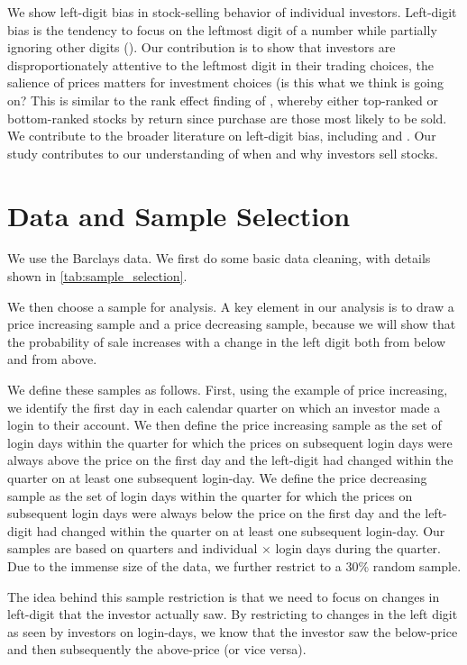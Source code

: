 We show left-digit bias in stock-selling behavior of individual investors. Left-digit bias is the tendency to focus on the leftmost digit of a number while partially ignoring other digits (\citealp{poltrock1984comparative}). Our contribution is to show that investors are disproportionately attentive to the leftmost digit in their trading choices, the salience of prices matters for investment choices (is this what we think is going on?  This is similar to the rank effect finding of \cite{hartzmark2015}, whereby either top-ranked or bottom-ranked stocks by return since purchase are those most likely to be sold. We contribute to the broader literature on left-digit bias, including \cite{lacetera2012heuristic} and \cite{shlain2018more}. Our study contributes to our understanding of when and why investors sell stocks. 

\section{Data and Sample Selection}

We use the Barclays data. We first do some basic data cleaning, with details shown in \ref{tab:sample_selection}. 

We then choose a sample for analysis. A key element in our analysis is to draw a price increasing sample and a price decreasing sample, because we will show that the probability of sale increases with a change in the left digit both from below and from above. 

We define these samples as follows. First, using the example of price increasing, we identify the first day in each calendar quarter on which an investor made a login to their account. We then define the price increasing sample as the set of login days within the quarter for which the prices on subsequent login days were always above the price on the first day and the left-digit had changed within the quarter on at least one subsequent login-day. We define the price decreasing sample as the set of login days within the quarter for which the prices on subsequent login days were always below the price on the first day and the left-digit had changed within the quarter on at least one subsequent login-day. Our samples are based on quarters and individual $\times$  login days during the quarter. Due to the immense size of the data, we further restrict to a 30\% random sample.

The idea behind this sample restriction is that we need to focus on changes in left-digit that the investor actually saw. By restricting to changes in the left digit as seen by investors on login-days, we know that the investor saw the below-price and then subsequently the above-price (or vice versa).

